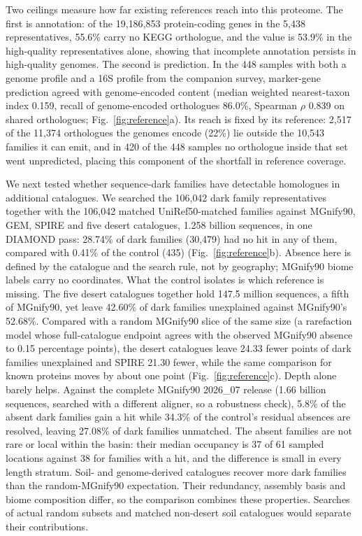 \documentclass[11pt]{article}
\begin{document}
Two ceilings measure how far existing references reach into this proteome. The first is
annotation: of the 19{,}186{,}853 protein-coding genes in the 5{,}438 representatives, 55.6\% carry
no KEGG orthologue, and the value is 53.9\% in the high-quality representatives alone, showing that incomplete annotation persists in high-quality genomes. The second is prediction. In the 448
samples with both a genome profile and a 16S profile from the companion survey, marker-gene
prediction agreed with genome-encoded content (median weighted nearest-taxon index 0.159, recall of
genome-encoded orthologues 86.0\%, Spearman $\rho$ 0.839 on shared orthologues;
Fig.~\ref{fig:reference}a). Its reach is fixed by its reference: 2{,}517 of the 11{,}374
orthologues the genomes encode (22\%) lie outside the 10{,}543 families it can emit, and in 420 of
the 448 samples no orthologue inside that set went unpredicted, placing this component of the shortfall in reference coverage.

We next tested whether sequence-dark families have detectable homologues in additional catalogues. We searched
the 106{,}042 dark family representatives together with the 106{,}042 matched UniRef50-matched
families against MGnify90, GEM, SPIRE and five desert catalogues, 1.258 billion sequences, in one
DIAMOND pass: 28.74\% of dark families (30{,}479) had no hit in any of them, compared with 0.41\% of
the control (435) (Fig.~\ref{fig:reference}b). Absence here is defined by the catalogue and the
search rule, not by geography; MGnify90 biome labels carry no coordinates. What the control isolates
is which reference is missing. The five desert catalogues together hold 147.5 million sequences, a
fifth of MGnify90, yet leave 42.60\% of dark families unexplained against MGnify90's 52.68\%.
Compared with a random MGnify90 slice of the same size (a rarefaction model whose full-catalogue endpoint agrees with the
observed MGnify90 absence to 0.15 percentage points), the desert catalogues leave 24.33 fewer points
of dark families unexplained and SPIRE 21.30 fewer, while the same comparison for known proteins moves
by about one point (Fig.~\ref{fig:reference}c). Depth alone barely helps. Against the complete
MGnify90 2026\_07 release (1.66 billion sequences, searched with a different aligner, so a robustness
check), 5.8\% of
the absent dark families gain a hit while 34.3\% of the control's residual absences are resolved,
leaving 27.08\% of dark families unmatched. The absent families are not rare or local within the
basin: their median occupancy is 37 of 61 sampled locations against 38 for families with a hit, and
the difference is small in every length stratum. Soil- and genome-derived catalogues recover more dark families than the random-MGnify90
expectation. Their redundancy, assembly basis and biome composition differ, so the comparison
combines these properties. Searches of actual random subsets and matched non-desert soil
catalogues would separate their contributions.
\end{document}
